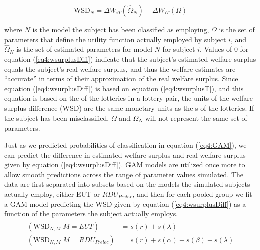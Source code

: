 \documentclass[../main.tex]{subfiles}
\begin{document}
\addtocounter{footnote}{-1}

\begin{equation}
	\label{eq4:wsurplusDiff}
	\text{WSD}_N = \Delta W_{iT}(\hat{\Omega}_N) - \Delta W_{iT}(\Omega)
\end{equation}

\noindent where $N$ is the model the subject has been classified as employing, $\Omega$ is the set of parameters that define the utility function actually employed by subject $i$, and $\hat{\Omega}_N$ is the set of estimated parameters for model $N$ for subject $i$.
Values of 0 for equation (\ref{eq4:wsurplusDiff}) indicate that the subject's estimated welfare surplus equals the subject's real welfare surplus, and thus the welfare estimates are \enquote{accurate} in terms of their approximation of the real welfare surplus.
Since equation (\ref{eq4:wsurplusDiff}) is based on equation (\ref{eq4:wsurplusT}), and this equation is based on the {\CE} of the lotteries in a lottery pair, the units of the welfare surplus difference (WSD) are the same monetary units as the {\CE}s of the lotteries.
If the subject has been misclassified, $\Omega$ and $\hat{\Omega}_N$ will not represent the same set of parameters.

Just as we predicted probabilities of classification in equation (\ref{eq4:GAM}), we can predict the difference in estimated welfare surplus and real welfare surplus given by equation (\ref{eq4:wsurplusDiff}).
GAM models are utilized once more to allow smooth predictions across the range of parameter values simulated.
The data are first separated into subsets based on the models the simulated subjects actually employ, either EUT or $\mathit{RDU_{Prelec}}$, and then for each pooled group we fit a GAM model predicting the WSD given by equation (\ref{eq4:wsurplusDiff}) as a function of the parameters the subject actually employs.
\begin{align}
	\label{eq4:GAM_welfare}
	\begin{split}
		(\text{WSD}_{N,M} | M = EUT)                   &= s(r) + s(\lambda)\\
		(\text{WSD}_{N,M} | M = \mathit{RDU_{Prelec}}) &= s(r) + s(\alpha) + s(\beta) + s(\lambda)
	\end{split}
\end{align}
\end{document}
